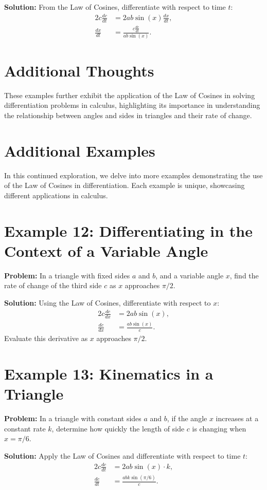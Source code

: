 \documentclass[a4paper,12pt]{book}
\newcounter{problem}
\newcounter{example}
\begin{document}
\textbf{Solution:}
From the Law of Cosines, differentiate with respect to time $t$:
\begin{align*}
2c \frac{dc}{dt} &= 2ab \sin(x) \frac{dx}{dt}, \\
\frac{dx}{dt} &= \frac{c \frac{dc}{dt}}{ab \sin(x)}.
\end{align*}

\section*{Additional Thoughts}
These examples further exhibit the application of the Law of Cosines in solving differentiation problems in calculus, highlighting its importance in understanding the relationship between angles and sides in triangles and their rate of change.

\section*{Additional Examples}
In this continued exploration, we delve into more examples demonstrating the use of the Law of Cosines in differentiation. Each example is unique, showcasing different applications in calculus.

\section{Example 12: Differentiating in the Context of a Variable Angle}
\textbf{Problem:} In a triangle with fixed sides $a$ and $b$, and a variable angle $x$, find the rate of change of the third side $c$ as $x$ approaches $\pi/2$.

\textbf{Solution:}
Using the Law of Cosines, differentiate with respect to $x$:
\begin{align*}
2c \frac{dc}{dx} &= 2ab \sin(x), \\
\frac{dc}{dx} &= \frac{ab \sin(x)}{c}.
\end{align*}
Evaluate this derivative as $x$ approaches $\pi/2$.

\section*{Example 13: Kinematics in a Triangle}
\textbf{Problem:} In a triangle with constant sides $a$ and $b$, if the angle $x$ increases at a constant rate $k$, determine how quickly the length of side $c$ is changing when $x = \pi/6$.

\textbf{Solution:}
Apply the Law of Cosines and differentiate with respect to time $t$:
\begin{align*}
2c \frac{dc}{dt} &= 2ab \sin(x) \cdot k, \\
\frac{dc}{dt} &= \frac{abk \sin(\pi/6)}{c}.
\end{align*}
\end{document}

